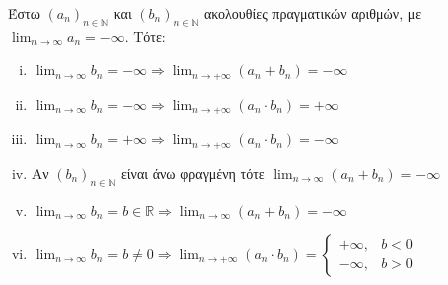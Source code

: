 \begin{mybox3}
  \begin{prop}
    Έστω $ {(a_{n})}_{n \in \mathbb{N}} $ και $ {(b_{n})}_{n \in \mathbb{N}} $ ακολουθίες 
    πραγματικών αριθμών, με $ \lim_{n \to \infty} a_{n}= -\infty $. Τότε:
    \begin{enumerate}[i)]
      \item $ \lim_{n \to \infty} b_{n} = -\infty \Rightarrow \lim_{n \to +\infty}
        (a_{n}+b_{n})= -\infty$
      \item $ \lim_{n \to \infty} b_{n} = -\infty \Rightarrow \lim_{n \to +\infty}
        (a_{n}\cdot b_{n})= +\infty$
      \item $ \lim_{n \to \infty} b_{n} = +\infty \Rightarrow \lim_{n \to +\infty}
        (a_{n}\cdot b_{n})= -\infty$
      \item Αν $ {(b_{n})}_{n \in \mathbb{N}} $ είναι άνω φραγμένη τότε $ \lim_{n \to
        \infty} (a_{n}+b_{n}) = -\infty $
      \item $ \lim_{n \to \infty} b_{n} = b \in \mathbb{R} 
        \Rightarrow \lim_{n \to \infty} (a_{n}+b_{n})= -\infty$
      \item $ \lim_{n \to \infty} b_{n} = b \neq 0 
        \Rightarrow \lim_{n \to +\infty} (a_{n}\cdot b_{n})= 
        \begin{cases} 
          +\infty, & b <0 \\
          -\infty, & b >0 
        \end{cases} $
    \end{enumerate}
  \end{prop}
\end{mybox3}
